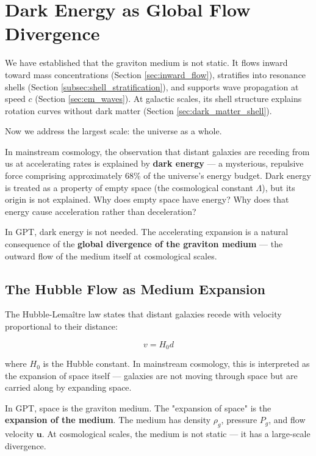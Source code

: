 \documentclass[12pt, a4paper]{article}
\begin{document}
\section{Dark Energy as Global Flow Divergence}
\label{sec:dark_energy}

We have established that the graviton medium is not static. It flows inward toward mass concentrations (Section \ref{sec:inward_flow}), stratifies into resonance shells (Section \ref{subsec:shell_stratification}), and supports wave propagation at speed \( c \) (Section \ref{sec:em_waves}). At galactic scales, its shell structure explains rotation curves without dark matter (Section \ref{sec:dark_matter_shell}).

Now we address the largest scale: the universe as a whole.

In mainstream cosmology, the observation that distant galaxies are receding from us at accelerating rates is explained by \textbf{dark energy} — a mysterious, repulsive force comprising approximately 68\% of the universe's energy budget. Dark energy is treated as a property of empty space (the cosmological constant \( \Lambda \)), but its origin is not explained. Why does empty space have energy? Why does that energy cause acceleration rather than deceleration?

In GPT, dark energy is not needed. The accelerating expansion is a natural consequence of the \textbf{global divergence of the graviton medium} — the outward flow of the medium itself at cosmological scales.

\subsection{The Hubble Flow as Medium Expansion}
\label{subsec:hubble_flow}

The Hubble-Lemaître law states that distant galaxies recede with velocity proportional to their distance:

\[
v = H_0 d
\]

where \( H_0 \) is the Hubble constant. In mainstream cosmology, this is interpreted as the expansion of space itself — galaxies are not moving through space but are carried along by expanding space.

In GPT, space is the graviton medium. The "expansion of space" is the \textbf{expansion of the medium}. The medium has density \( \rho_g \), pressure \( P_g \), and flow velocity \( \mathbf{u} \). At cosmological scales, the medium is not static — it has a large-scale divergence.
\end{document}
